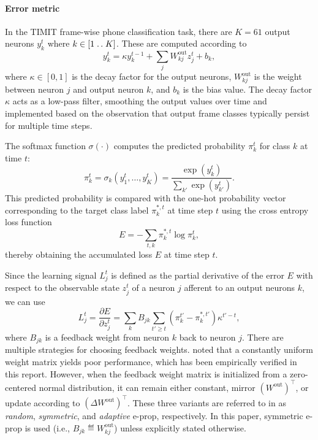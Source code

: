             \paragraph{Error metric}
            In the TIMIT frame-wise phone classification task, there are $K=61$ output neurons $y^t_k$ where $k \in [1\mathrel{{.}\,{.}}\nobreak K]$.
            These are computed according to
            \begin{equation}\label{eq:bellec_y}
            y^t_k = \kappa y^{t-1}_k + \sum_jW^\text{out}_{kj}z^t_j + b_k,
            \end{equation}
            where $\kappa \in [0, 1]$ is the decay factor for the output neurons, $W^\text{out}_{kj}$ is the weight between neuron $j$ and output neuron $k$, and $b_k$ is the bias value.
            The decay factor $\kappa$ acts as a low-pass filter, smoothing the output values over time and implemented based on the observation that output frame classes typically persist for multiple time steps.

            The softmax function $\sigma(\cdot)$ computes the predicted probability $\pi^t_k$ for class $k$ at time $t$:
            \begin{equation}
            \pi^t_k = \sigma_k\left(y^t_1,\ldots,y^t_K\right) = \frac{\exp\left(y^t_k\right)}{\sum_{k'}\exp\left(y^t_{k'}\right)}.
            \end{equation}
            This predicted probability is compared with the one-hot probability vector corresponding to the target class label $\pi^{*,t}_k$ at time step $t$ using the cross entropy loss function
            \begin{equation}
            E = -\sum_{t,k}\pi^{*,t}_k\log\pi^t_k,
            \end{equation}
            thereby obtaining the accumulated loss $E$ at time step $t$.

            Since the learning signal $L^t_j$ is defined as the partial derivative of the error $E$ with respect to the observable state $z_j^t$ of a neuron $j$ afferent to an output neurons $k$, we can use
            \begin{equation}\label{eq:learningsignal_after_output}
            L^t_j = \frac{\partial E}{\partial z^t_j} = \sum_kB_{jk}\sum_{t'\geq t}\left(\pi^{t'}_k - \pi^{*,t'}_k\right)\kappa^{t'-t},
            \end{equation}
            where $B_{jk}$ is a feedback weight from neuron $k$ back to neuron $j$.
            There are multiple strategies for choosing feedback weights.
            \citet{bellec2020solution} noted that a constantly uniform weight matrix yields poor performance, which has been empirically verified in this report.
            However, when the feedback weight matrix is initialized from a zero-centered normal distribution, it can remain either constant, mirror $(W^\text{out})^\top$, or update according to $(\Delta W^\text{out})^\top$.
            These three variants are referred to in \citet{bellec2020solution} as \emph{random}, \emph{symmetric}, and \emph{adaptive} e-prop, respectively.
            In this paper, symmetric e-prop is used (i.e., $B_{jk} \eqdef W^\text{out}_{kj}$) unless explicitly stated otherwise.

